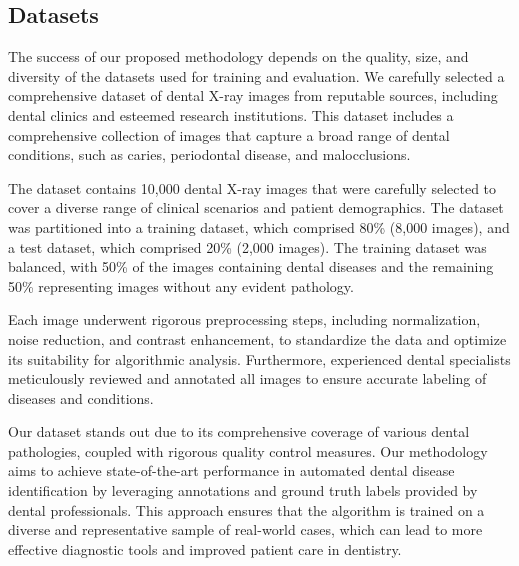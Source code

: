 \documentclass[journal,twoside,web]{ieeecolor}
\begin{document}
\subsection{Datasets}

The success of our proposed methodology depends on the quality, size, and diversity of the datasets used for training and evaluation. We carefully selected a comprehensive dataset of dental X-ray images from reputable sources, including dental clinics and esteemed research institutions. This dataset includes a comprehensive collection of images that capture a broad range of dental conditions, such as caries, periodontal disease, and malocclusions.

The dataset contains 10,000 dental X-ray images that were carefully selected to cover a diverse range of clinical scenarios and patient demographics. The dataset was partitioned into a training dataset, which comprised 80\% (8,000 images), and a test dataset, which comprised 20\% (2,000 images). The training dataset was balanced, with 50\% of the images containing dental diseases and the remaining 50\% representing images without any evident pathology.

Each image underwent rigorous preprocessing steps, including normalization, noise reduction, and contrast enhancement, to standardize the data and optimize its suitability for algorithmic analysis. Furthermore, experienced dental specialists meticulously reviewed and annotated all images to ensure accurate labeling of diseases and conditions.

Our dataset stands out due to its comprehensive coverage of various dental pathologies, coupled with rigorous quality control measures. Our methodology aims to achieve state-of-the-art performance in automated dental disease identification by leveraging annotations and ground truth labels provided by dental professionals. This approach ensures that the algorithm is trained on a diverse and representative sample of real-world cases, which can lead to more effective diagnostic tools and improved patient care in dentistry.
\end{document}

